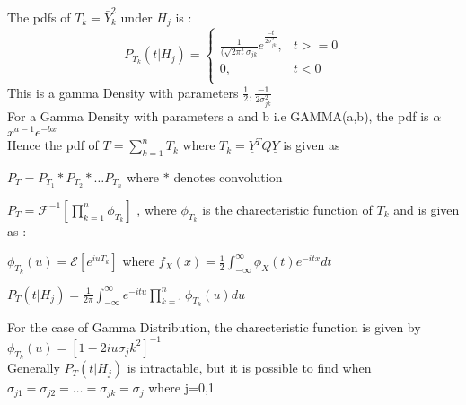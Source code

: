 \documentclass[12pt]{report}
\begin{document}
\noindent The pdfs of $ T_k=\bar{Y}_k^{2}$ under $ H_j$ is :\\
\begin{equation}
	P_{T_k}(t|H_j)=
	\begin{cases}
	\frac{1}{(\sqrt{2\pi t}\sigma_{jk}}e^{\frac{-t}{2\sigma_{jk}^{2}}},& t>=0\\
	0,& t<0\\
	\end{cases}
\end{equation}	
\noindent This is a gamma Density with parameters 	$ \frac{1}{2}, \frac{-1}{2\sigma_{jk}^{2}}$\\

\noindent For a Gamma Density with parameters a and b i.e GAMMA(a,b), the pdf is $\alpha$ $x^{a-1}e^{-bx}$\\
	
\noindent	Hence the pdf of $ T=  \sum_{k=1}^{n}T_k$       where $T_k=\underline{Y}^TQ\underline{Y}$ is given as \\
\begin{center}	
\noindent	$P_T=P_{T_1}\ast P_{T_2}\ast \ldots P_{T_n}$      where $\ast$ denotes convolution\\
\end{center}
\noindent	$P_T=\mathcal{F}^{-1}[\prod_{k=1}^{n}\phi_{T_k}]$ , where $\phi_{T_k}$ is the charecteristic function of $T_k$ and is given as :\\
\begin{center}
\noindent  	$\phi_{T_k}(u)=\mathcal{E}[e^{iuT_k}]$ where $f_X(x)=\frac{1}{2}\int_{-\infty}^{\infty}\phi_X(t)e^{-itx}dt$\\

\end{center}
\begin{center}
\noindent$P_T(t|H_j)=\frac{1}{2\pi}\int_{-\infty}^{\infty}e^{-itu}\prod_{k=1}^{n}\phi_{T_k}(u)du$\\
\end{center}	
	
	
\noindent	For the case of Gamma Distribution, the charecteristic function is given by $\phi_{T_k}(u)=[1-2iu\sigma_jk^{2}]^{-1}$\\
	
\noindent	Generally $P_T(t|H_j)$ is intractable, but it is possible to find when $\sigma_{j1}=\sigma_{j2}=\ldots=\sigma_{jk}=\sigma_j$ where j=0,1\\
	
\end{document}
